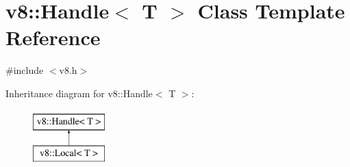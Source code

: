 \hypertarget{classv8_1_1Handle}{\section{v8\-:\-:Handle$<$ T $>$ Class Template Reference}
\label{classv8_1_1Handle}
}


{\ttfamily \#include $<$v8.\-h$>$}

Inheritance diagram for v8\-:\-:Handle$<$ T $>$\-:\begin{figure}[H]
\begin{center}
\leavevmode
\includegraphics[height=2.000000cm]{classv8_1_1Handle}
\end{center}
\end{figure}
